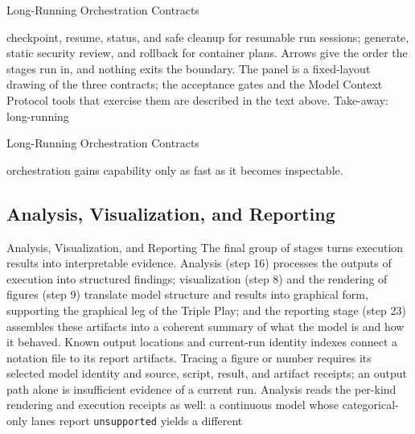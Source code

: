 \documentclass[
  ignorenonframetext,
]{beamer}
\newenvironment{archivecaptionframe}{\par\begingroup}{\par\endgroup}
\begin{document}
\begin{frame}{Long-Running Orchestration
Contracts}

\begin{archivecaptionframe}

checkpoint, resume, status, and safe cleanup for resumable run sessions;
generate, static security review, and rollback for container plans.
Arrows give the order the stages run in, and nothing exits the boundary.
The panel is a fixed-layout drawing of the three contracts; the
acceptance gates and the Model Context Protocol tools that exercise them
are described in the text above. Take-away: long-running

\end{archivecaptionframe}

\end{frame}

\begin{frame}{Long-Running Orchestration
Contracts}

\begin{archivecaptionframe}

orchestration gains capability only as fast as it becomes inspectable.

\end{archivecaptionframe}


\end{frame}

\subsection{Analysis, Visualization, and
Reporting}\label{analysis-visualization-and-reporting}

\begin{frame}{Analysis, Visualization, and
Reporting}
The final group of stages turns execution results into interpretable
evidence. Analysis (step 16) processes the outputs of execution into
structured findings; visualization (step 8) and the rendering of figures
(step 9) translate model structure and results into graphical form,
supporting the graphical leg of the Triple Play; and the reporting stage
(step 23) assembles these artifacts into a coherent summary of what the
model is and how it behaved. Known output locations and current-run
identity indexes connect a notation file to its report artifacts.
Tracing a figure or number requires its selected model identity and
source, script, result, and artifact receipts; an output path alone is
insufficient evidence of a current run. Analysis reads the per-kind
rendering and execution receipts as well: a continuous model whose
categorical-only lanes report \texttt{unsupported} yields a different
\end{frame}
\end{document}
